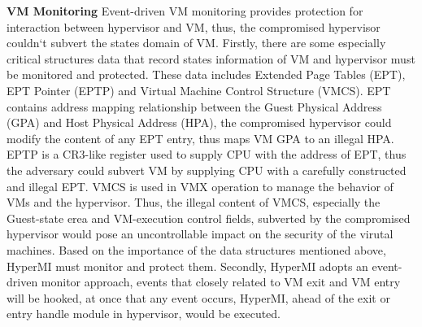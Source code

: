 \documentclass[conference]{IEEEtran}
\begin{document}
\textbf{VM Monitoring}
Event-driven VM monitoring provides protection for interaction between hypervisor and VM, thus, the compromised hypervisor couldn`t subvert the states domain of VM. 
Firstly, there are some especially critical structures data that record states information of VM and hypervisor must be monitored and protected. These data includes Extended Page Tables (EPT), EPT Pointer (EPTP) and Virtual Machine Control Structure (VMCS). EPT contains address mapping relationship between the Guest Physical Address (GPA) and Host Physical Address (HPA), the compromised hypervisor could modify the content of any EPT entry, thus maps VM GPA to an illegal HPA. EPTP is a CR3-like register used to supply CPU with the address of EPT, thus the adversary could subvert VM by supplying CPU with a carefully constructed and illegal EPT. VMCS is used in VMX operation to manage the behavior of VMs and the hypervisor. Thus, the illegal content of VMCS, especially the Guest-state erea and VM-execution control fields, subverted by the compromised hypervisor would pose an uncontrollable impact on the security of the virutal machines. 
Based on the importance of the data structures mentioned above, HyperMI must monitor and protect them. 
Secondly, HyperMI adopts an event-driven monitor approach, events that closely related to VM exit and VM entry will be hooked, at once that any event occurs, HyperMI, ahead of the exit or entry handle module in hypervisor, would be executed. 
\end{document}
